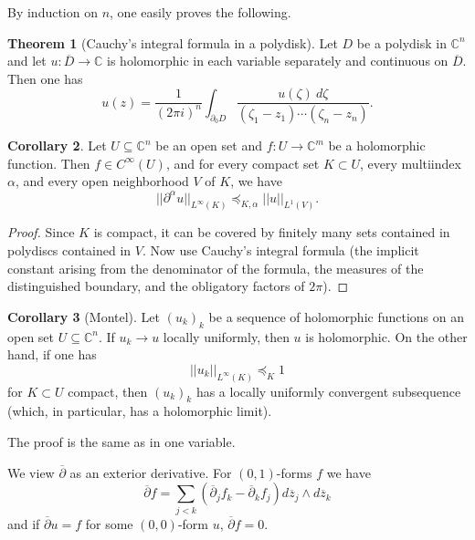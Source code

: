 \documentclass[12pt]{report}
\newcommand{\CC}{\mathbb{C}}
\newcommand{\dbar}{\overline \partial}
\theoremstyle{definition}
\newtheorem{theorem}{Theorem}[chapter]
\newtheorem{corollary}[theorem]{Corollary}
\begin{document}
By induction on $n$, one easily proves the following.
\begin{theorem}[Cauchy's integral formula in a polydisk]
    Let $D$ be a polydisk in $\CC^n$ and let $u: \overline D \to \CC$ is holomorphic in each variable separately and continuous on $\overline D$. Then one has
    $$u(z) = \frac{1}{(2\pi i)^n} \int_{\partial_0 D} \frac{u(\zeta) ~d\zeta}{(\zeta_1 - z_1)\cdots(\zeta_n - z_n)}.$$
\end{theorem}
\begin{corollary}
    Let $U \subseteq \CC^n$ be an open set and $f: U \to \CC^m$ be a holomorphic function. Then $f \in C^\infty(U)$, and for every compact set $K \subset U$, every multiindex $\alpha$, and every open neighborhood $V$ of $K$, we have
    $$||\partial^\alpha u||_{L^\infty(K)} \preceq_{K,\alpha} ||u||_{L^1(V)}.$$
\end{corollary}
\begin{proof}
    Since $K$ is compact, it can be covered by finitely many sets contained in polydiscs contained in $V$. Now use Cauchy's integral formula (the implicit constant arising from the denominator of the formula, the measures of the distinguished boundary, and the obligatory factors of $2\pi$).
\end{proof}
\begin{corollary}[Montel]
    Let $(u_k)_k$ be a sequence of holomorphic functions on an open set $U \subseteq \CC^n$. If $u_k \to u$ locally uniformly, then $u$ is holomorphic. On the other hand, if one has
    $$||u_k||_{L^\infty(K)} \preceq_K 1$$
    for $K \subset U$ compact, then $(u_k)_k$ has a locally uniformly convergent subsequence (which, in particular, has a holomorphic limit).
\end{corollary}
The proof is the same as in one variable.

We view $\dbar$ as an exterior derivative. For $(0, 1)$-forms $f$ we have
$$\dbar f = \sum_{j<k} (\dbar_j f_k - \dbar_k f_j) d\overline z_j \wedge d\overline z_k$$
and if $\dbar u = f$ for some $(0, 0)$-form $u$, $\dbar f = 0$.
\end{document}
